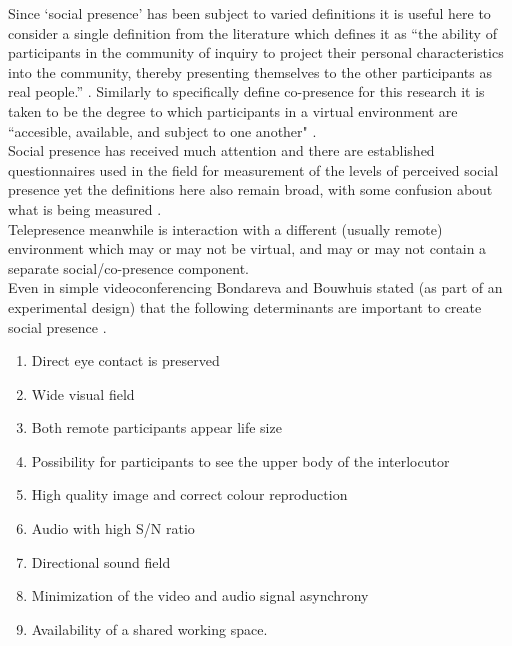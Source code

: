  Since `social presence' has been subject to varied definitions \cite{Biocca2003} it is useful here to consider a single definition from the literature which defines it as ``the ability of participants in the community of inquiry to project their personal characteristics into the community, thereby presenting themselves to the other participants as real people.'' \cite{Garrison1999, Beck2011}. Similarly to specifically define co-presence for this research it is taken to be the degree to which participants in a virtual environment are ``accesible, available, and subject to one another" \cite{Biocca2003}. \\
            Social presence has received much attention and there are established questionnaires used in the field for measurement of the levels of perceived social presence yet the definitions here also remain broad, with some confusion about what is being measured \cite{Biocca2003a}.\\            
 Telepresence meanwhile is interaction with a different (usually remote) environment which may or may not be virtual, and may or may not contain a separate social/co-presence component. \\ 
       Even in simple videoconferencing Bondareva and Bouwhuis stated (as part of an experimental design) that the following determinants are important to create social presence \cite{Bondareva2004, jouppi2002mutually}. 
            \begin{enumerate}
            \item    Direct eye contact is preserved
            \item    Wide visual field
            \item    Both remote participants appear life size
            \item    Possibility for participants to see the upper body of the interlocutor
            \item    High quality image and correct colour reproduction
            \item    Audio with high S/N ratio
            \item    Directional sound field
            \item    Minimization of the video and audio signal asynchrony
            \item    Availability of a shared working space.
            \end{enumerate}
			
